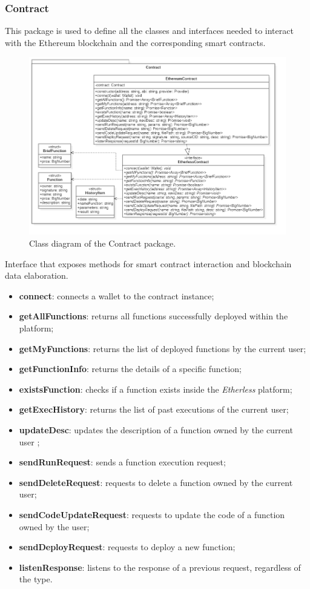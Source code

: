 		\subsubsection{Contract} 
		This package is used to define all the classes and interfaces needed to interact with the Ethereum blockchain and the corresponding smart contracts. 
		\begin{figure} [h!]
			\centering
			\includegraphics[width=0.75\linewidth]{diagrammi/etherless-cli/Contract}
			\caption{Class diagram of the Contract package.}
		\end{figure}
	
			Interface that exposes methods for smart contract interaction and blockchain data elaboration. 	
			
					\begin{itemize}
						\item \textbf{connect}: connects a wallet to the contract instance;
						\item \textbf{getAllFunctions}: returns all functions successfully deployed within the platform;
						\item \textbf{getMyFunctions}: returns the list of deployed functions by the current user;
						\item \textbf{getFunctionInfo}: returns the details of a specific function;
						\item \textbf{existsFunction}: checks if a function exists inside the \textit{Etherless} platform;
						\item \textbf{getExecHistory}: returns the list of past executions of the current user;
						\item \textbf{updateDesc}: updates the description of a function owned by the current user ;
						\item \textbf{sendRunRequest}: sends a function execution request;
						\item \textbf{sendDeleteRequest}: requests to delete a function owned by the current user; 
						\item \textbf{sendCodeUpdateRequest}: requests to update the code of a function owned by the user; 
						\item \textbf{sendDeployRequest}: requests to deploy a new function; 
						\item \textbf{listenResponse}: listens to the response of a previous request, regardless of the type.
					\end{itemize}
		
